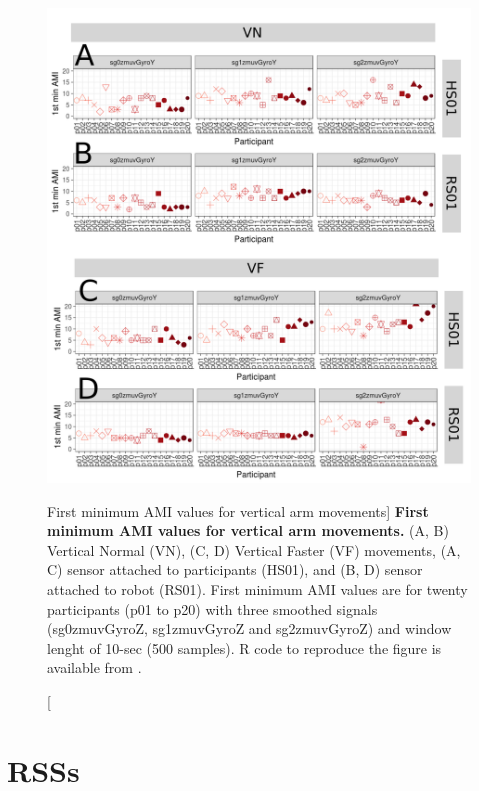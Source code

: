 \begin{figure}
\centering
\includegraphics[width=1.0\textwidth]{ami_aVw10}
	\caption
	[First minimum AMI values for vertical arm movements]{
	{\bf First minimum AMI values for vertical arm movements.}
		(A, B) Vertical Normal (VN), (C, D) Vertical Faster (VF) 
		movements,
		(A, C) sensor attached to participants (HS01), and
		(B, D) sensor attached to robot (RS01).
		First minimum AMI values are for twenty participants 
		(p01 to p20) with three smoothed signals (sg0zmuvGyroZ, 
		sg1zmuvGyroZ and sg2zmuvGyroZ) and  window lenght of 
		10-sec (500 samples).
		R code to reproduce the figure is available 
		from \cite{xochicale2018}.
        }
    \label{fig:amiV}
\end{figure}




\newpage
\section{RSSs} \label{appendix:e:rsss}

